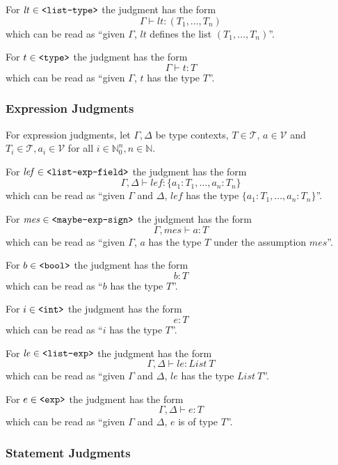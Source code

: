 \documentclass[]{scrbook}
\newcommand{\mf}[1]{\text{\texttt{#1}}}
\theoremstyle{definition}
\theoremstyle{definition}
\theoremstyle{definition}
\theoremstyle{remark}
\begin{document}
For \(\mathit{lt}\in\mf{<list-type>}\) the judgment has the form
\[\Gamma\vdash \mathit{lt}:(T_1,\dots,T_n)\] which can be read as
\enquote{given \(\Gamma\), \(lt\) defines the list \((T_1,\dots,T_n)\)}.

For \(t\in\mf{<type>}\) the judgment has the form \[\Gamma\vdash t:T\]
which can be read as \enquote{given \(\Gamma\), \(t\) has the type
\(T\)}.

\subsubsection*{Expression Judgments}\label{expression-judgments}

For expression judgments, let \(\Gamma,\Delta\) be type contexts,
\(T\in\mathcal{T}\), \(a\in\mathcal{V}\) and
\(T_i\in\mathcal{T},a_i\in\mathcal{V}\) for all
\(i\in\mathbb{N}_0^n,n\in\mathbb{N}\).

For \(\mathit{lef}\in\mf{<list-exp-field>}\) the judgment has the form
\[\Gamma,\Delta\vdash \mathit{lef}:\{a_1:T_1,\dots, a_n:T_n\}\] which
can be read as \enquote{given \(\Gamma\) and \(\Delta\),
\(\mathit{lef}\) has the type \(\{a_1:T_1,\dots,a_n:T_n\}\)}.

For \(\mathit{mes}\in\mf{<maybe-exp-sign>}\) the judgment has the form
\[\Gamma,\mathit{mes}\vdash a:T\] which can be read as \enquote{given
\(\Gamma\), \(a\) has the type \(T\) under the assumption
\(\mathit{mes}\)}.

For \(b\in\mf{<bool>}\) the judgment has the form \[b:T\] which can be
read as \enquote{\(b\) has the type \(T\)}.

For \(i\in\mf{<int>}\) the judgment has the form \[e:T\] which can be
read as \enquote{\(i\) has the type \(T\)}.

For \(\mathit{le}\in\mf{<list-exp>}\) the judgment has the form
\[\Gamma,\Delta\vdash \mathit{le}:\mathit{List} \ T\] which can be read
as \enquote{given \(\Gamma\) and \(\Delta\), \(le\) has the type
\(\mathit{List} \ T\)}.

For \(e\in\mf{<exp>}\) the judgment has the form
\[\Gamma,\Delta\vdash e:T\] which can be read as \enquote{given
\(\Gamma\) and \(\Delta\), \(e\) is of type \(T\)}.

\subsubsection*{Statement Judgments}\label{statement-judgments}
\end{document}
